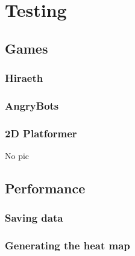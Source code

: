 \section{Testing}
\label{Testing}



\subsection{Games}
\label{Testing_Games}



\subsubsection{Hiraeth}
\label{Testing_Games_Hiraeth}


\subsubsection{AngryBots}
\label{Testing_Games_AB}


\subsubsection{2D Platformer}
\label{Testing_Games_2D}

No pic

\subsection{Performance}
\label{Testing_Performance}


\subsubsection{Saving data}
\label{Testing_Performance_Saving}



\subsubsection{Generating the heat map}
\label{Testing_Performance_Generating}

